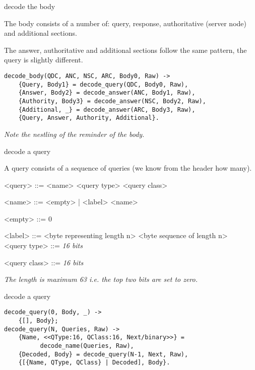 \begin{frame}[fragile]{decode the body}

The body consists of a number of: query, response, authoritative (server node) and additional sections.

\vspace{10pt}\pause

The answer, authoritative and additional sections follow the same pattern,
the query is slightly different.

\begin{verbatim}
decode_body(QDC, ANC, NSC, ARC, Body0, Raw) ->
    {Query, Body1} = decode_query(QDC, Body0, Raw),
    {Answer, Body2} = decode_answer(ANC, Body1, Raw),
    {Authority, Body3} = decode_answer(NSC, Body2, Raw),
    {Additional, _} = decode_answer(ARC, Body3, Raw),
    {Query, Answer, Authority, Additional}.
\end{verbatim}

\vspace{10pt}\pause

{\em Note the nestling of the reminder of the body.}

\end{frame}

\begin{frame}{decode a query}

A query consists of a sequence of queries (we know from the header how many).

\begin{grammar}
<query> ::= <name> <query type> <query class>

<name> ::= <empty> | <label> <name>

<empty> ::=  0 

<label> ::=  <byte representing length n> <byte sequence of length n> \\

<query type> ::= {\em 16 bits}

<query class> ::= {\em 16 bits}

\end{grammar}

{\em The length is maximum 63 i.e. the top two bits are set to zero.}

\end{frame}

\begin{frame}[fragile]{decode a query}

\begin{verbatim}
decode_query(0, Body, _) ->
    {[], Body};
decode_query(N, Queries, Raw) ->
    {Name, <<QType:16, QClass:16, Next/binary>>} = 
          decode_name(Queries, Raw),
    {Decoded, Body} = decode_query(N-1, Next, Raw),
    {[{Name, QType, QClass} | Decoded], Body}.
\end{verbatim}

\end{frame}


